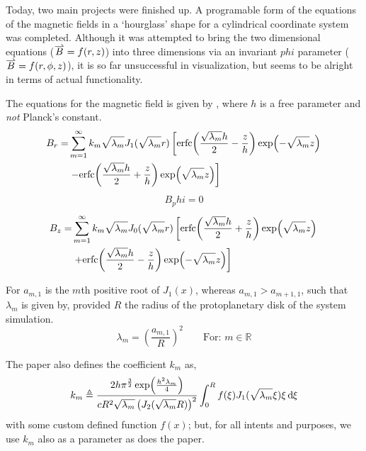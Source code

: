 \documentclass[twocolumn]{article}
\begin{document}
Today, two main projects were finished up. A programable form of the equations of the magnetic fields in a `hourglass' shape for a cylindrical coordinate system was completed. Although it was attempted to bring the two dimensional equations ($\vect{B} = f(r,z)$) into three dimensions via an invariant $phi$ parameter ($\vect{B} = f(r,\phi,z)$), it is so far unsuccessful in visualization, but seems to be alright in terms of actual functionality.

The equations for the magnetic field is given by \cite{Ewertowski_Basu_2013}, where $h$ is a free parameter and \textit{not} Planck's constant.
\begin{align}
	B_r =& \sum_{m=1}^{\infty} k_m \sqrt{\lambda_m} J_1(\sqrt{\lambda_m} r) \left\lbrack \erfc{\frac{\sqrt{\lambda_m} h}{2} - \frac{z}{h}} \exp{-\sqrt{\lambda_m} z} \right. \nonumber \\ 
	&\left. - \erfc{\frac{\sqrt{\lambda_m} h}{2} + \frac{z}{h}} \exp{\sqrt{\lambda_m} z} \right\rbrack
	\label{eq:Ewertowski_Basu_B_r_equation}
\end{align}
\begin{align}
	B_phi = 0
	\label{Ewertowski_Basu_B_phi_equation}
\end{align}
\begin{align}
	B_z =& \sum_{m=1}^{\infty} k_m \sqrt{\lambda_m} J_0(\sqrt{\lambda_m} r) \left\lbrack \erfc{\frac{\sqrt{\lambda_m} h}{2} + \frac{z}{h}} \exp{\sqrt{\lambda_m} z} \right.  \nonumber \\ 
	&\left. + \erfc{\frac{\sqrt{\lambda_m} h}{2} - \frac{z}{h}} \exp{-\sqrt{\lambda_m} z} \right\rbrack
	\label{eq:Ewertowski_Basu_B_z_equation}
\end{align}

For $a_{m,1}$ is the $m$th positive root of $J_1(x)$, whereas $a_{m,1} > a_{m+1,1}$, such that $\lambda_m$ is given by, provided $R$ the radius of the protoplanetary disk of the system simulation.
\begin{equation*}
	\lambda_m = \left( \frac{a_{m,1}}{R} \right)^2 \qquad \text{For: } m \in \mathbb{R}
\end{equation*}

The paper also defines the coefficient $k_m$ as,
\begin{equation*}
	k_m \triangleq \frac{2 h \pi^{\frac{3}{2}} \exp{\frac{h^2 \lambda_m}{4}}}{c R^2 \sqrt{\lambda_m} \left( J_2(\sqrt{\lambda_m} R) \right)^2} \int_0^R f(\xi) J_1(\sqrt{\lambda_m} \xi) \xi \diff{\xi}
\end{equation*}
with some custom defined function $f(x)$; but, for all intents and purposes, we use $k_m$ also as a parameter as does the paper.
\end{document}
